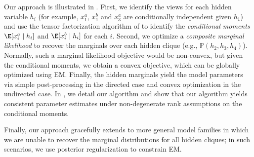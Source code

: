 
Our approach is illustrated in . 
First, we identify the views for each hidden variable $h_i$ (for example,
$x_1^a$, $x_1^b$ and $x_3^a$ are conditionally independent given $h_1$) and use
the tensor factorization algorithm of
\citet{anandkumar12moments,anandkumar13tensor} to identify the \emph{conditional
moments} $\E[x_i^a \mid h_i]$ and $\E[x_i^b \mid h_i]$ for each $i$.
Second, we optimize a \emph{composite marginal likelihood} to recover the marginals over
each hidden clique (e.g., $\mathbb P(h_2, h_3, h_4)$).
Normally, such a marginal likelihood objective would be non-convex,
but given the conditional moments, we obtain a convex objective,
which can be globally optimized using EM.
Finally, the hidden marginals yield the model parameters
via simple post-processing in the directed case and convex optimization in the undirected case.
In , we detail our algorithm and
show that our algorithm yields consistent parameter estimates
under non-degenerate rank assumptions on the conditional moments.

Finally, our approach gracefully extends to more general model families
  in which we are unable to recover the marginal distributions for all
  hidden cliques; in such scenarios, we use posterior regularization to constrain
  EM.  
